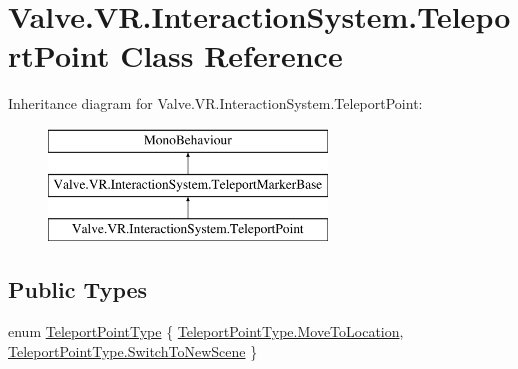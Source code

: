 \hypertarget{class_valve_1_1_v_r_1_1_interaction_system_1_1_teleport_point}{}\section{Valve.\+V\+R.\+Interaction\+System.\+Teleport\+Point Class Reference}
\label{class_valve_1_1_v_r_1_1_interaction_system_1_1_teleport_point}
Inheritance diagram for Valve.\+V\+R.\+Interaction\+System.\+Teleport\+Point\+:\begin{figure}[H]
\begin{center}
\leavevmode
\includegraphics[height=3.000000cm]{class_valve_1_1_v_r_1_1_interaction_system_1_1_teleport_point}
\end{center}
\end{figure}
\subsection*{Public Types}
\begin{DoxyCompactItemize}
\item 
enum \mbox{\hyperlink{class_valve_1_1_v_r_1_1_interaction_system_1_1_teleport_point_a1a849ffcc7eea342470d494523085b57}{Teleport\+Point\+Type}} \{ \mbox{\hyperlink{class_valve_1_1_v_r_1_1_interaction_system_1_1_teleport_point_a1a849ffcc7eea342470d494523085b57a16808f36574d3edac6f7fee3ac10dd28}{Teleport\+Point\+Type.\+Move\+To\+Location}}, 
\mbox{\hyperlink{class_valve_1_1_v_r_1_1_interaction_system_1_1_teleport_point_a1a849ffcc7eea342470d494523085b57a46a34d77315c610788142e02132ca21e}{Teleport\+Point\+Type.\+Switch\+To\+New\+Scene}}
 \}
\end{DoxyCompactItemize}
